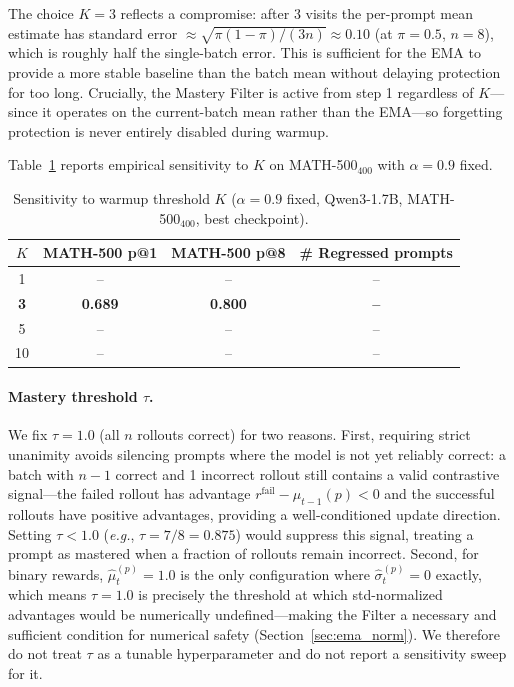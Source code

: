 \documentclass[11pt]{article}
\newcommand{\eg}{\textit{e.g.}}
\theoremstyle{definition}
\begin{document}
The choice $K=3$ reflects a compromise: after 3 visits the per-prompt
mean estimate has standard error $\approx \sqrt{\pi(1-\pi)/(3n)} \approx 0.10$
(at $\pi=0.5$, $n=8$), which is roughly half the single-batch error.
This is sufficient for the EMA to provide a more stable baseline than the
batch mean without delaying protection for too long.
Crucially, the Mastery Filter is active from step 1 regardless of $K$---since
it operates on the current-batch mean rather than the EMA---so forgetting
protection is never entirely disabled during warmup.

Table~\ref{tab:hparam_K} reports empirical sensitivity to $K$ on
MATH-500$_{\text{400}}$ with $\alpha=0.9$ fixed.

\begin{table}[h]
\centering
\caption{Sensitivity to warmup threshold $K$ ($\alpha=0.9$ fixed,
  Qwen3-1.7B, MATH-500$_{\text{400}}$, best checkpoint).}
\label{tab:hparam_K}
\small
\begin{tabular}{cccc}
\toprule
$K$ & MATH-500 p@1 & MATH-500 p@8 & \# Regressed prompts \\
\midrule
1  & -- & -- & -- \\
\textbf{3}  & \textbf{0.689} & \textbf{0.800} & \textbf{--} \\
5  & -- & -- & -- \\
10 & -- & -- & -- \\
\bottomrule
\end{tabular}
\end{table}

\paragraph{Mastery threshold $\tau$.}
We fix $\tau=1.0$ (all $n$ rollouts correct) for two reasons.
First, requiring strict unanimity avoids silencing prompts where the model
is not yet reliably correct: a batch with $n-1$ correct and 1 incorrect
rollout still contains a valid contrastive signal---the failed rollout has
advantage $r^{\text{fail}} - \mu_{t-1}(p) < 0$ and the successful rollouts
have positive advantages, providing a well-conditioned update direction.
Setting $\tau < 1.0$ (\eg, $\tau = 7/8 = 0.875$) would suppress this
signal, treating a prompt as mastered when a fraction of rollouts remain
incorrect.
Second, for binary rewards, $\hat{\mu}_t^{(p)} = 1.0$ is the only
configuration where $\hat{\sigma}_t^{(p)} = 0$ exactly, which means
$\tau=1.0$ is precisely the threshold at which std-normalized advantages
would be numerically undefined---making the Filter a necessary and
sufficient condition for numerical safety (Section~\ref{sec:ema_norm}).
We therefore do not treat $\tau$ as a tunable hyperparameter and do not
report a sensitivity sweep for it.
\end{document}
